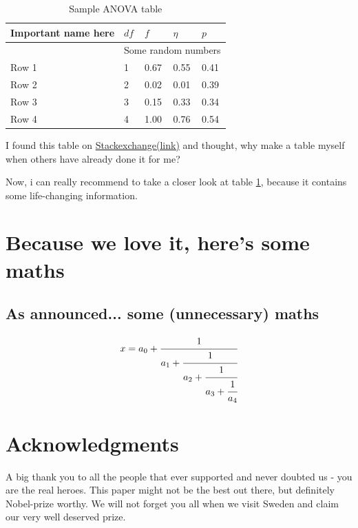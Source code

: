 \documentclass[fleqn,10pt]{olplainarticle}
\begin{document}
\begin{table}[h]
\centering
  \begin{threeparttable}
    \caption{Sample ANOVA table}
    \label{tab:table numero uno}
     \begin{tabular}{lllll}
        \toprule
        Important name here & \( df \) & \( f \) & \( \eta \) & \( p \) \\
        \midrule
                 &     \multicolumn{4}{c}{Some random numbers}     \\
        Row 1    & 1        & 0.67    & 0.55       & 0.41    \\
        Row 2    & 2        & 0.02    & 0.01       & 0.39    \\
        Row 3    & 3        & 0.15    & 0.33       & 0.34    \\
        Row 4    & 4        & 1.00    & 0.76       & 0.54    \\
        \bottomrule
     \end{tabular}
    \begin{tablenotes}
      \small
      \item I found this table on \href {https://tex.stackexchange.com/questions/12676/add-notes-under-the-table}{Stackexchange(link)}
      and thought, why make a table myself when others have already done it for me?
    \end{tablenotes}
  \end{threeparttable}
\end{table}
Now, i can really recommend to take a closer look at table \ref{tab:table numero uno}, because it contains some life-changing information.


\section{Because we love it, here's some maths}
\subsection{As announced... some (unnecessary) maths}
\begin{equation}
  x = a_0 + \cfrac{1}{a_1 
          + \cfrac{1}{a_2 
          + \cfrac{1}{a_3 + \cfrac{1}{a_4} } } }
\end{equation}

\newpage
\section*{Acknowledgments}

A big thank you to all the people that ever supported and never doubted us - you are the real heroes. This paper might not be the best out there, but definitely Nobel-prize worthy. We will not forget you all when we visit Sweden and claim our very well deserved prize.

\newpage

\end{document}
